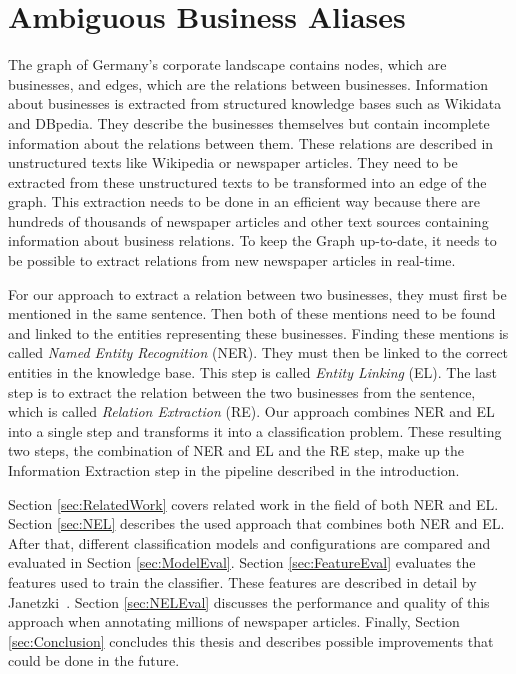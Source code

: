 \section{Ambiguous Business Aliases}
\label{sec:IntroABA}
The graph of Germany's corporate landscape contains nodes, which are businesses, and edges, which are the relations between businesses. Information about businesses is extracted from structured knowledge bases such as Wikidata and DBpedia. They describe the businesses themselves but contain incomplete information about the relations between them. These relations are described in unstructured texts like Wikipedia or newspaper articles. They need to be extracted from these unstructured texts to be transformed into an edge of the graph. This extraction needs to be done in an efficient way because there are hundreds of thousands of newspaper articles and other text sources containing information about business relations. To keep the Graph up-to-date, it needs to be possible to extract relations from new newspaper articles in real-time.\par
For our approach to extract a relation between two businesses, they must first be mentioned in the same sentence. Then both of these mentions need to be found and linked to the entities representing these businesses. Finding these mentions is called \textit{Named Entity Recognition} (NER). They must then be linked to the correct entities in the knowledge base. This step is called \textit{Entity Linking} (EL). The last step is to extract the relation between the two businesses from the sentence, which is called \textit{Relation Extraction} (RE). Our approach combines NER and EL into a single step and transforms it into a classification problem. These resulting two steps, the combination of NER and EL and the RE step, make up the Information Extraction step in the pipeline described in the introduction.\par
Section \ref{sec:RelatedWork} covers related work in the field of both NER and EL. Section \ref{sec:NEL} describes the used approach that combines both NER and EL. After that, different classification models and configurations are compared and evaluated in Section \ref{sec:ModelEval}. Section \ref{sec:FeatureEval} evaluates the features used to train the classifier. These features are described in detail by Janetzki\ \cite{janetzki}. Section \ref{sec:NELEval} discusses the performance and quality of this approach when annotating millions of newspaper articles. Finally, Section \ref{sec:Conclusion} concludes this thesis and describes possible improvements that could be done in the future.
